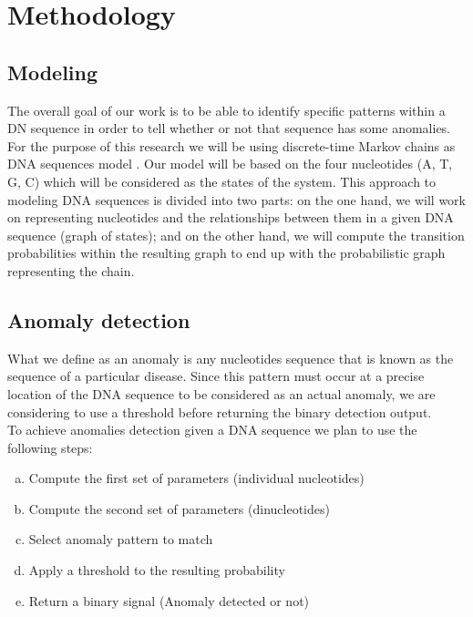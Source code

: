 \documentclass[10pt,twocolumn,letterpaper]{article}
\begin{document}
\section{Methodology}
 {  
    \subsection{Modeling}  
    {
        The overall goal of our work is to be able to identify specific patterns within a DN sequence in order to tell whether or not that sequence has some anomalies.\\
        For the purpose of this research we will be using discrete-time Markov chains as DNA sequences model \cite{singh}. 
       Our model will be based on the four nucleotides (A, T, G, C) which will be considered as the states of the system.
       This approach to modeling DNA sequences is divided into two parts: on the one hand, we will work on representing nucleotides and the relationships between them in a given DNA sequence (graph of states); 
           and on the other hand, we will compute the transition probabilities within the resulting graph to end up with the probabilistic graph representing the chain.
    }  

    \subsection{Anomaly detection}
    {What we define as an anomaly is any nucleotides sequence that is known as the sequence of a particular disease. Since this pattern must occur at a precise location of the DNA sequence to be considered as an actual 
    anomaly, we are considering to use a threshold before returning the binary detection output.\\ 
    To achieve anomalies detection given a DNA sequence we plan to use the following steps:
    \begin{enumerate}[a.]
        \item Compute the first set of parameters (individual nucleotides)
        \item Compute the second set of parameters (dinucleotides)
        \item Select anomaly pattern to match
        \item Apply a threshold to the resulting probability 
        \item Return a binary signal (Anomaly detected or not)
    \end{enumerate}
    }
 }



 {\small
  
  
 }
\end{document}

